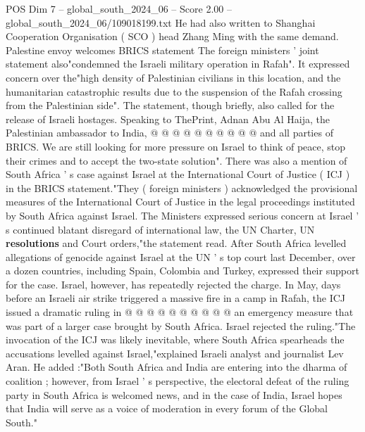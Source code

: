 \begin{textsample}{POS Dim 7 – global\_south\_2024\_06 – Score 2.00 – global\_south\_2024\_06/109018199.txt}
He had also written to Shanghai Cooperation Organisation ( SCO ) head Zhang Ming with the same demand.
Palestine envoy welcomes BRICS statement The foreign ministers ' joint statement also"condemned the Israeli military operation in Rafah".
It expressed concern over the"high density of Palestinian civilians in this location, and the humanitarian catastrophic results due to the suspension of the Rafah crossing from the Palestinian side".
The statement, though briefly, also called for the release of Israeli hostages.
Speaking to ThePrint, Adnan Abu Al Haija, the Palestinian ambassador to India, @ @ @ @ @ @ @ @ @ @ and all parties of BRICS.
We are still looking for more pressure on Israel to think of peace, stop their crimes and to accept the two-state solution".
There was also a mention of South Africa ' s case against Israel at the International Court of Justice ( ICJ ) in the BRICS statement."They ( foreign ministers ) acknowledged the provisional measures of the International Court of Justice in the legal proceedings instituted by South Africa against Israel.
The Ministers expressed serious concern at Israel ' s continued blatant disregard of international law, the UN Charter, UN \textbf{resolutions} and Court orders,"the statement read.
After South Africa levelled allegations of genocide against Israel at the UN ' s top court last December, over a dozen countries, including Spain, Colombia and Turkey, expressed their support for the case.
Israel, however, has repeatedly rejected the charge.
In May, days before an Israeli air strike triggered a massive fire in a camp in Rafah, the ICJ issued a dramatic ruling in @ @ @ @ @ @ @ @ @ @ an emergency measure that was part of a larger case brought by South Africa.
Israel rejected the ruling."The invocation of the ICJ was likely inevitable, where South Africa spearheads the accusations levelled against Israel,"explained Israeli analyst and journalist Lev Aran.
He added :"Both South Africa and India are entering into the dharma of coalition ; however, from Israel ' s perspective, the electoral defeat of the ruling party in South Africa is welcomed news, and in the case of India, Israel hopes that India will serve as a voice of moderation in every forum of the Global South."

\end{textsample}

